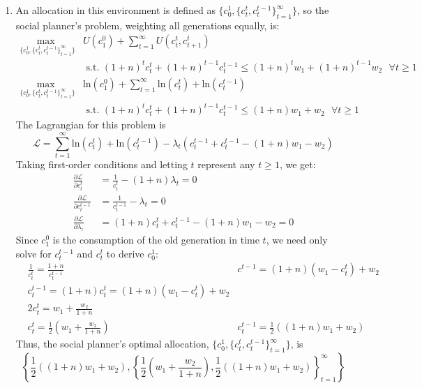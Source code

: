 \documentclass{article}
\newcommand{\loge}[1]{\text{ln}\left(#1\right)}
\newcommand{\usmax}[1]{\underset{\{#1\}}{\text{max }}}
\renewcommand{\L}{\mathcal{L}}
\begin{document}
\begin{enumerate}

	\item An allocation in this environment is defined as $\{c_0^1,\{c_t^t,c_t^{t-1}\}_{t=1}^\infty\}$, so the social planner's problem, weighting all generations equally, is:
		\begin{align*}
			\usmax{c_0^1,\{c_t^t,c_t^{t-1}\}_{t=1}^\infty} &U(c_1^0) + \sum_{t=1}^\infty U(c_t^t,c_{t+1}^t) 				\\
			&\text{ s.t. }(1+n)^tc_t^t + (1+n)^{t-1}c_t^{t-1}\leq (1+n)^t w_1 + (1+n)^{t-1}w_2\text{ }\forall t\geq 1							\\
			\usmax{c_0^1,\{c_t^t,c_t^{t-1}\}_{t=1}^\infty} &\loge{c_1^0} + \sum_{t=1}^\infty \loge{c_t^t} +\loge{c_t^{t-1}}	\\
			 &\text{ s.t. } (1+n)^t c_t^t + (1+n)^{t-1}c_t^{t-1}\leq (1+n)w_1 + w_2\text{ }\forall t\geq 1
		\end{align*}
		The Lagrangian for this problem is
		\[
			\L= \sum_{t=1}^\infty \loge{c_t^t} + \loge{c_t^{t-1}} -\lambda_t\left(c_t^{t-1} + c_t^{t-1}- (1+n)w_1 - w_2\right)
		\]
		Taking first-order conditions and letting $t$ represent any $t\geq 1$, we get:
		\begin{align*}
			\frac{\partial\L}{\partial c_t^t} 		&= \frac{1}{c_t^t} 		- (1+n)\lambda_t	= 0	\\
			\frac{\partial\L}{\partial c_t^{t-1}} 	&= \frac{1}{c_t^{t-1}} 	- \lambda_t			= 0	\\
			\frac{\partial\L}{\partial \lambda_t} 	&= (1+n)c_t^t + c_t^{t-1} - (1+n)w_1 - w_2	= 0		
		\end{align*}
		Since $c_1^0$ is the consumption of the old generation in time $t$, we need only solve for $c_t^{t-1}$ and $c_t^t$ to derive $c_0^1$:
		\begin{align*}
			& \frac{1}{c_t^t}  = \frac{1+n}{c_t^{t-1}}					& c^{t-1} = (1+n)(w_1-c_t^t) + w_2 	\\
			& c_t^{t-1} = (1+n)c_t^t = (1+n)(w_1-c_t^t) + w_2												\\
			& 2c_t^t 	= w_1 + \frac{w_2}{1+n}																\\
			& c_t^t		= \frac{1}{2}\left(w_1 + \frac{w_2}{1+n}\right) & c_t^{t-1}	= \frac{1}{2}\left((1+n)w_1 + w_2\right)
		\end{align*}
		Thus, the social planner's optimal allocation, $\{c_0^1,\{c_t^t,c_t^{t-1}\}_{t=1}^\infty\}$, is 
		\[
			\left\{\frac{1}{2}\left((1+n)w_1 + w_2\right),\left\{\frac{1}{2}\left(w_1 + \frac{w_2}{1+n}\right),\frac{1}{2}\left((1+n)w_1 + w_2\right)\right\}_{t=1}^\infty\right\}
		\]


\end{enumerate}


\end{document}
